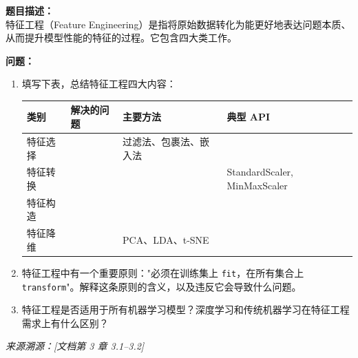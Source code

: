 \documentclass[a4paper,11pt]{ctexart}
\begin{document}
\begin{problembox}
    \textbf{题目描述：}\\
    特征工程（Feature Engineering）是指将原始数据转化为能更好地表达问题本质、从而提升模型性能的特征的过程。它包含四大类工作。

    \vspace{0.3cm}
    \textbf{问题：}
    \begin{enumerate}[(1)]
        \item 填写下表，总结特征工程四大内容：

        \begin{center}
        \begin{tabular}{p{2.5cm} p{3.5cm} p{3.5cm} p{3cm}}
            \toprule
            类别 & 解决的问题 & 主要方法 & 典型 API \\
            \midrule
            特征选择 & \underline{\hspace{3cm}} & 过滤法、包裹法、嵌入法 & \underline{\hspace{2.5cm}} \\[1.2em]
            特征转换 & \underline{\hspace{3cm}} & \underline{\hspace{3cm}} & StandardScaler, MinMaxScaler \\[1.2em]
            特征构造 & \underline{\hspace{3cm}} & \underline{\hspace{3cm}} & \underline{\hspace{2.5cm}} \\[1.2em]
            特征降维 & \underline{\hspace{3cm}} & PCA、LDA、t-SNE & \underline{\hspace{2.5cm}} \\
            \bottomrule
        \end{tabular}
        \end{center}

        \item 特征工程中有一个重要原则："必须在训练集上 \texttt{fit}，在所有集合上 \texttt{transform}"。解释这条原则的含义，以及违反它会导致什么问题。

        \item 特征工程是否适用于所有机器学习模型？深度学习和传统机器学习在特征工程需求上有什么区别？
    \end{enumerate}
    {\color{gray}\small\textit{来源溯源：[文档第 3 章 3.1--3.2]}}
\end{problembox}
\end{document}
